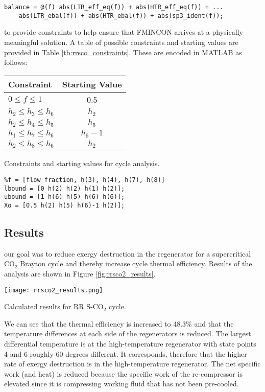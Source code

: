 \begin{lstlisting}
balance = @(f) abs(LTR_eff_eq(f)) + abs(HTR_eff_eq(f)) + ...
    abs(LTR_ebal(f)) + abs(HTR_ebal(f)) + abs(sp3_ident(f));
\end{lstlisting}

 to provide constraints to help ensure that FMINCON arrives at a physically meaningful solution. A table of possible constraints and starting values are provided in Table \ref{tb:rrsco_constraints}. These are encoded in MATLAB as follows:
\begin{margintable}
\begin{tabular}{lc}
\toprule
Constraint & Starting Value \\
\midrule
$0 \le f \le 1$ & 0.5 \\
$h_2 \le h_3 \le h_6$ & $h_2$ \\
$h_2 \le h_4 \le h_5$ & $h_5$ \\
$h_1 \le h_7 \le h_6$ & $h_6-1$ \\
$h_2 \le h_8 \le h_6$ & $h_2$ \\
\bottomrule
\end{tabular}
\caption{Constraints and starting values for cycle analysis.}
\label{tb:rrsco_constraints}
\end{margintable}

\begin{lstlisting}
%f = [flow fraction, h(3), h(4), h(7), h(8)]
lbound = [0 h(2) h(2) h(1) h(2)];
ubound = [1 h(6) h(5) h(6) h(6)];
Xo = [0.5 h(2) h(5) h(6)-1 h(2)];
\end{lstlisting}

\subsection{Results}
 our goal was to reduce exergy destruction in the regenerator for a supercritical CO$_{2}$ Brayton cycle and thereby increase cycle thermal efficiency.  Results of the analysis are shown in Figure \ref{fig:rrsco2_results}. 
\begin{marginfigure}
\texttt{[image: rrsco2\_results.png]}
\caption{Calculated results for RR S-CO$_{2}$ cycle.}
\label{fig:rrsco2_results}
\end{marginfigure}
We can see that the thermal efficiency is increased to 48.3\% and that the temperature differences at each side of the regenerators is reduced.  The largest differential temperature is at the high-temperature regenerator with state points 4 and 6 roughly 60 degrees different. It corresponds, therefore that the higher rate of exergy destruction is in the high-temperature regenerator.  The net specific work (and heat) is reduced because the specific work of the re-compressor is elevated since it is compressing working fluid that has not been pre-cooled.  


